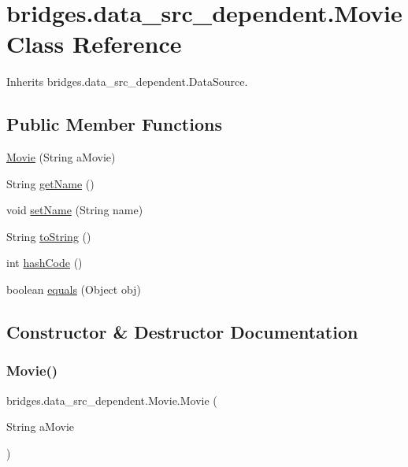 \hypertarget{classbridges_1_1data__src__dependent_1_1_movie}{}\section{bridges.\+data\+\_\+src\+\_\+dependent.\+Movie Class Reference}
\label{classbridges_1_1data__src__dependent_1_1_movie}


Inherits bridges.\+data\+\_\+src\+\_\+dependent.\+Data\+Source.

\subsection*{Public Member Functions}
\begin{DoxyCompactItemize}
\item 
\mbox{\hyperlink{classbridges_1_1data__src__dependent_1_1_movie_a77ae2f134fac04a725fcb31bdbd44883}{Movie}} (String a\+Movie)
\item 
String \mbox{\hyperlink{classbridges_1_1data__src__dependent_1_1_movie_a168439a5933e62c95db1d86b8d85dba7}{get\+Name}} ()
\item 
void \mbox{\hyperlink{classbridges_1_1data__src__dependent_1_1_movie_a1b4a3072962e5d35f035fad21b73f0f1}{set\+Name}} (String name)
\item 
String \mbox{\hyperlink{classbridges_1_1data__src__dependent_1_1_movie_a99d2b0845c4cbbbc141d38b5518704c6}{to\+String}} ()
\item 
int \mbox{\hyperlink{classbridges_1_1data__src__dependent_1_1_movie_a20fffd543345ecc7b171d3ccccffc882}{hash\+Code}} ()
\item 
boolean \mbox{\hyperlink{classbridges_1_1data__src__dependent_1_1_movie_afc8150c86e72b35eedd7885ec0edab98}{equals}} (Object obj)
\end{DoxyCompactItemize}


\subsection{Constructor \& Destructor Documentation}
\mbox{\label{classbridges_1_1data__src__dependent_1_1_movie_a77ae2f134fac04a725fcb31bdbd44883}} 
\subsubsection{\texorpdfstring{Movie()}{Movie()}}
{\footnotesize\ttfamily bridges.\+data\+\_\+src\+\_\+dependent.\+Movie.\+Movie (\begin{DoxyParamCaption}\item[{String}]{a\+Movie }\end{DoxyParamCaption})}



